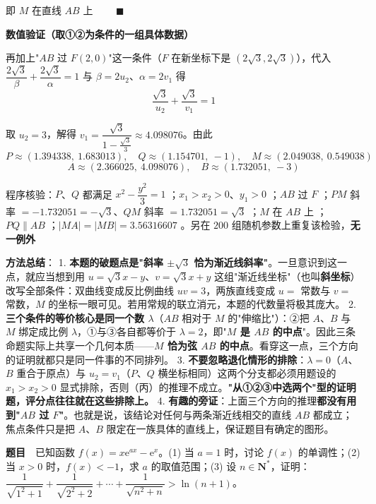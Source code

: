 即 $M$ 在直线 $AB$ 上 $\qquad\blacksquare$

\par\medskip

\textbf{数值验证（取①②为条件的一组具体数据）}

再加上"$AB$ 过 $F(2,0)$"这一条件（$F$ 在新坐标下是 $\left(2\sqrt3,2\sqrt3\right)$），代入 $\dfrac{2\sqrt3}\beta+\dfrac{2\sqrt3}\alpha=1$ 与 $\beta=2u_2$、$\alpha=2v_1$ 得
\[\frac{\sqrt3}{u_2}+\frac{\sqrt3}{v_1}=1\]

取 $u_2=3$，解得 $v_1=\dfrac{\sqrt3}{1-\frac{\sqrt3}3}\approx4.098076$。由此
\[P\approx(1.394338,\ 1.683013),\quad Q\approx(1.154701,\ -1),\quad M\approx(2.049038,\ 0.549038)\]
\[A\approx(2.366025,\ 4.098076),\quad B\approx(1.732051,\ -3)\]

程序核验：$P$、$Q$ 都满足 $x^{2}-\dfrac{y^{2}}3=1$ ；$x_1>x_2>0$、$y_1>0$ ；$AB$ 过 $F$ ；$PM$ 斜率 $=-1.732051=-\sqrt3$、$QM$ 斜率 $=1.732051=\sqrt3$ ；$M$ 在 $AB$ 上 ；$PQ\parallel AB$ ；$|MA|=|MB|=3.56316607$ 。另在 $200$ 组随机参数上重复该检验，\textbf{无一例外} 

\begin{gktip}
\textbf{方法总结}：
1. \textbf{本题的破题点是"斜率 $\pm\sqrt3$ 恰为渐近线斜率"}。一旦意识到这一点，就应当想到用 $u=\sqrt3x-y$、$v=\sqrt3x+y$ 这组"渐近线坐标"（也叫\textbf{斜坐标}）改写全部条件：双曲线变成反比例曲线 $uv=3$，两族直线变成 $u=$ 常数与 $v=$ 常数，$M$ 的坐标一眼可见。若用常规的联立消元，本题的代数量将极其庞大。
2. \textbf{三个条件的等价核心是同一个数 $\lambda$}（$AB$ 相对于 $M$ 的"伸缩比"）：②把 $A$、$B$ 与 $M$ 绑定成比例 $\lambda$，①与③各自都等价于 $\lambda=2$，即"\textbf{$M$ 是 $AB$ 的中点}"。因此三条命题实际上共享一个几何本质——\textbf{$M$ 恰为弦 $AB$ 的中点}。看穿这一点，三个方向的证明就都只是同一件事的不同排列。
3. \textbf{不要忽略退化情形的排除}：$\lambda=0$（$A$、$B$ 重合于原点）与 $u_2=v_1$（$P$、$Q$ 横坐标相同）这两个分支都必须用题设的 $x_1>x_2>0$ 显式排除，否则（丙）的推理不成立。\textbf{"从①②③中选两个"型的证明题，评分点往往就在这些排除上。}
4. \textbf{有趣的旁证}：上面三个方向的推理\textbf{都没有用到"$AB$ 过 $F$"}。也就是说，该结论对任何与两条渐近线相交的直线 $AB$ 都成立；焦点条件只是把 $A$、$B$ 限定在一族具体的直线上，保证题目有确定的图形。
\end{gktip}

\par\medskip


\textbf{题目}　已知函数 $f(x)=x\mathrm e^{ax}-\mathrm e^{x}$。(1) 当 $a=1$ 时，讨论 $f(x)$ 的单调性；(2) 当 $x>0$ 时，$f(x)<-1$，求 $a$ 的取值范围；(3) 设 $n\in\mathbf N^{*}$，证明：$\dfrac1{\sqrt{1^{2}+1}}+\dfrac1{\sqrt{2^{2}+2}}+\cdots+\dfrac1{\sqrt{n^{2}+n}}>\ln(n+1)$。

